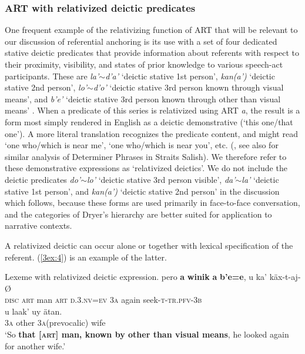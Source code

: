 \documentclass[output=paper]{langsci/langscibook}
\begin{document}
\subsubsection{ART with relativized deictic predicates}\label{3sec:211}

One frequent example of the relativizing function of ART that will be relevant to our discussion of referential anchoring is its use with a set of four dedicated stative deictic predicates that provide information about referents with respect to their proximity, visibility, and states of prior knowledge to various speech-act participants.  These are {\emph{la'$\sim$d'a'}} `deictic stative 1st person', {\emph{kan(a')}} `deictic stative 2nd person', {\emph{lo'$\sim$d'o'}} `deictic stative 3rd person known through visual means', and {\emph{b'e'}} `deictic stative 3rd person known through other than visual means' \citep{danziger:94}.  When a predicate of this series is relativized using ART {\emph{a}}, the result is a form most simply rendered in English as a deictic demonstrative (`this one/that one').  A more literal translation recognizes the predicate content, and might read `one who/which is near me', `one who/which is near you', etc. (\citealt[][891-894]{danziger:94}, see also \citealt[][489-490]{jelinek:95} for similar analysis of Determiner Phrases in Straits Salish).  We therefore refer to these demonstrative expressions as `relativized deictics'.  We do not include the deictic predicates {\emph{do'$\sim$lo'}} `deictic stative 3rd person visible', {\emph{da'$\sim$la'}} `deictic stative 1st person', and {\emph{kan(a')}} `deictic stative 2nd person' in the discussion which follows, because these forms are used primarily in face-to-face conversation, and the categories of Dryer's hierarchy are better suited for application to narrative contexts.

A relativized deictic can occur alone or together with lexical specification of the referent. (\ref{3ex:4}) is an example of the latter.

\begin{exe}
\ex\label{3ex:4}
Lexeme with relativized deictic expression. 
\exi{}
\gll	pero 		{\textbf{a}} 	{\textbf{winik}} 	{\textbf{a}} 	{\textbf{b'e=e}}, 				u 		ka'		k\"ax-t-aj-\O  \\
	{\textsc{disc}}	{\textsc{art}}	man			{\textsc{art}}	{\textsc{d}}.3.{\textsc{nv=ev}}	3{\textsc{a}}	again	seek-{\textsc{t-tr.pfv-3b}} \\
\glt
\exi{}
\gll	u 		laak' 		uy				\"atan. \\
	3{\textsc{a}}	other		3{\textsc{a}}(prevocalic)	wife \\
\glt	`So {\textbf{that [{\textsc{art}}] man, known by other than visual means}}, he looked again for another wife.'
\end{exe}
\end{document}
